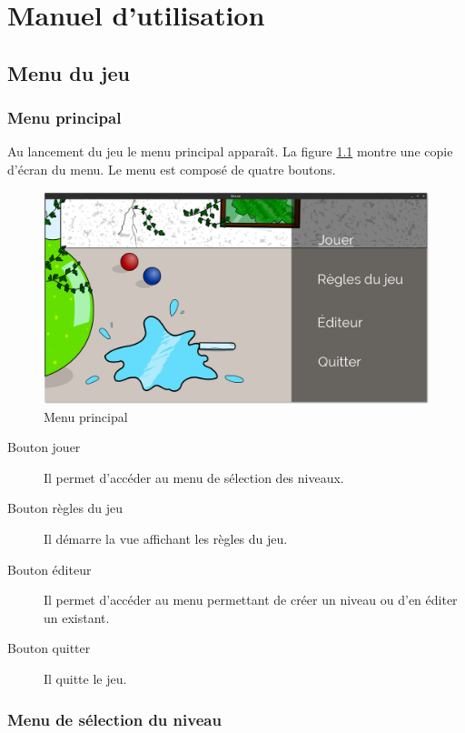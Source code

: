 \chapter{Manuel d'utilisation}

\section{Menu du jeu}

\subsection{Menu principal}

Au lancement du jeu le menu principal apparaît. La figure
\ref{fig:manuel-menu-principal} montre une copie d'écran du menu.
Le menu est composé de quatre boutons.

\begin{figure}[h]
    \centering
    \includegraphics[width=13cm]{figures/manuel-menu-principal.png}
    \caption{Menu principal}
    \label{fig:manuel-menu-principal}
\end{figure}

\begin{description}
\item[Bouton jouer]
    Il permet d'accéder au menu de sélection des niveaux.
\item[Bouton règles du jeu]
    Il démarre la vue affichant les règles du jeu.
\item[Bouton éditeur]
    Il permet d'accéder au menu permettant de créer un niveau
    ou d'en éditer un existant.
\item[Bouton quitter]
    Il quitte le jeu.
\end{description}

\subsection{Menu de sélection du niveau}

